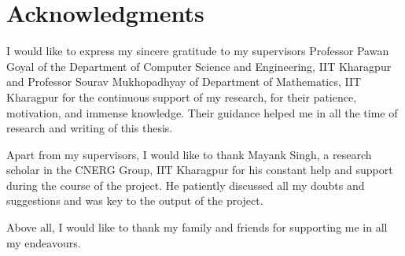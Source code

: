 \chapter*{Acknowledgments}
I would like to express my sincere gratitude to my supervisors Professor Pawan Goyal of the Department of Computer Science and Engineering, IIT Kharagpur and Professor Sourav Mukhopadhyay of Department of Mathematics, IIT Kharagpur for the continuous support of my research, for their patience, motivation, and immense knowledge. Their guidance helped me in all the time of research and writing of this thesis.

Apart from my supervisors, I would like to thank Mayank Singh, a research scholar in the CNERG Group, IIT Kharagpur for his constant help and support during the course of the project. He patiently discussed all my doubts and suggestions and was key to the output of the project.

Above all, I would like to thank my family and friends for supporting me in all my endeavours.
